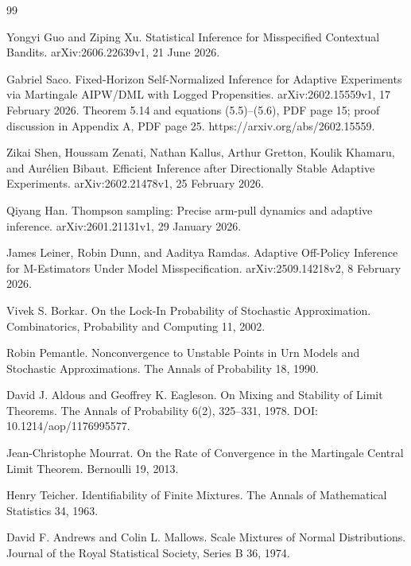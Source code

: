 \documentclass{article}
\begin{document}
\begin{thebibliography}{99}

   Yongyi Guo and Ziping Xu. Statistical Inference for Misspecified Contextual Bandits. arXiv:2606.22639v1, 21 June 2026.

   Gabriel Saco. Fixed-Horizon Self-Normalized Inference for Adaptive Experiments via Martingale AIPW/DML with Logged Propensities. arXiv:2602.15559v1, 17 February 2026. Theorem 5.14 and equations (5.5)--(5.6), PDF page 15; proof discussion in Appendix A, PDF page 25. https://arxiv.org/abs/2602.15559.

   Zikai Shen, Houssam Zenati, Nathan Kallus, Arthur Gretton, Koulik Khamaru, and Aurélien Bibaut. Efficient Inference after Directionally Stable Adaptive Experiments. arXiv:2602.21478v1, 25 February 2026.

   Qiyang Han. Thompson sampling: Precise arm-pull dynamics and adaptive inference. arXiv:2601.21131v1, 29 January 2026.

   James Leiner, Robin Dunn, and Aaditya Ramdas. Adaptive Off-Policy Inference for M-Estimators Under Model Misspecification. arXiv:2509.14218v2, 8 February 2026.

   Vivek S. Borkar. On the Lock-In Probability of Stochastic Approximation. Combinatorics, Probability and Computing 11, 2002.

   Robin Pemantle. Nonconvergence to Unstable Points in Urn Models and Stochastic Approximations. The Annals of Probability 18, 1990.

   David J. Aldous and Geoffrey K. Eagleson. On Mixing and Stability of Limit Theorems. The Annals of Probability 6(2), 325--331, 1978. DOI: 10.1214/aop/1176995577.

   Jean-Christophe Mourrat. On the Rate of Convergence in the Martingale Central Limit Theorem. Bernoulli 19, 2013.

   Henry Teicher. Identifiability of Finite Mixtures. The Annals of Mathematical Statistics 34, 1963.

   David F. Andrews and Colin L. Mallows. Scale Mixtures of Normal Distributions. Journal of the Royal Statistical Society, Series B 36, 1974.


\end{thebibliography}
\end{document}
